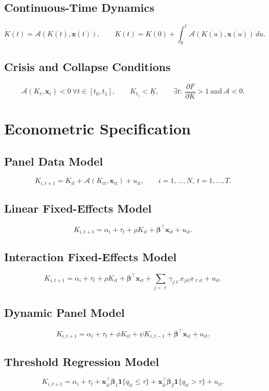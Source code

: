 \documentclass[11pt]{article}
\begin{document}
\subsection{Continuous-Time Dynamics}
\[
\dot K(t)=\mathcal{A}(K(t),\bm{x}(t)),
\qquad K(t)=K(0)+\int_0^t\mathcal{A}(K(u),\bm{x}(u))\,du.
\]

\subsection{Crisis and Collapse Conditions}
\[
\mathcal{A}(K_t,\bm{x}_t)<0\ \forall t\in[t_0,t_1],
\qquad K_{t_1}<\underline{K},
\qquad \exists t:\ \frac{\partial F}{\partial K}>1\ \text{and}\ \mathcal{A}<0.
\]

\section{Econometric Specification}

\subsection{Panel Data Model}
\[
K_{i,t+1}=K_{it}+\mathcal{A}(K_{it},\bm{x}_{it})+u_{it},
\qquad i=1,\dots,N,\ t=1,\dots,T.
\]

\subsection{Linear Fixed-Effects Model}
\[
K_{i,t+1}=\alpha_i+\tau_t+\rho K_{it}+\bm{\beta}^\top\bm{x}_{it}+u_{it}.
\]

\subsection{Interaction Fixed-Effects Model}
\[
K_{i,t+1}=\alpha_i+\tau_t+\rho K_{it}+\bm{\beta}^\top\bm{x}_{it}+\sum_{j<\ell}\gamma_{j\ell}x_{jit}x_{\ell it}+u_{it}.
\]

\subsection{Dynamic Panel Model}
\[
K_{i,t+1}=\alpha_i+\tau_t+\phi K_{it}+\psi K_{i,t-1}+\bm{\beta}^\top\bm{x}_{it}+u_{it}.
\]

\subsection{Threshold Regression Model}
\[
K_{i,t+1}=\alpha_i+\tau_t+\bm{x}_{it}^\top\bm{\beta}_1\mathbf{1}\{q_{it}\le\tau\}+\bm{x}_{it}^\top\bm{\beta}_2\mathbf{1}\{q_{it}>\tau\}+u_{it}.
\]
\end{document}

